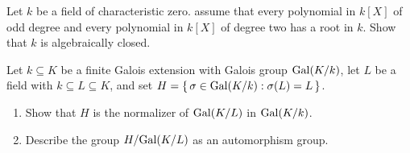 \begin{problem}
  Let \(k\) be a field of characteristic zero. assume that every polynomial
  in \(k[X]\) of odd degree and every polynomial in \(k[X]\) of degree two
  has a root in \(k\). Show that \(k\) is algebraically closed.
\end{problem}
\begin{solution}
\end{solution}

\begin{problem}
  Let \(k\subseteq K\) be a finite Galois extension with Galois group
  \(\operatorname{Gal}(K/k)\), let \(L\) be a field with \( k\subseteq L\subseteq K\),
  and set \(H=\left\{\,\sigma\in\operatorname{Gal}(K/k):\sigma(L)=L\,\right\}\).
  \begin{enumerate}[label=(\alph*),noitemsep]
  \item Show that \(H\) is the normalizer of \(\operatorname{Gal}(K/L)\) in
    \(\operatorname{Gal}(K/k)\).
  \item Describe the group \(H/{\operatorname{Gal}(K/L)}\) as an automorphism group.
  \end{enumerate}
\end{problem}
\begin{solution}
\end{solution}

